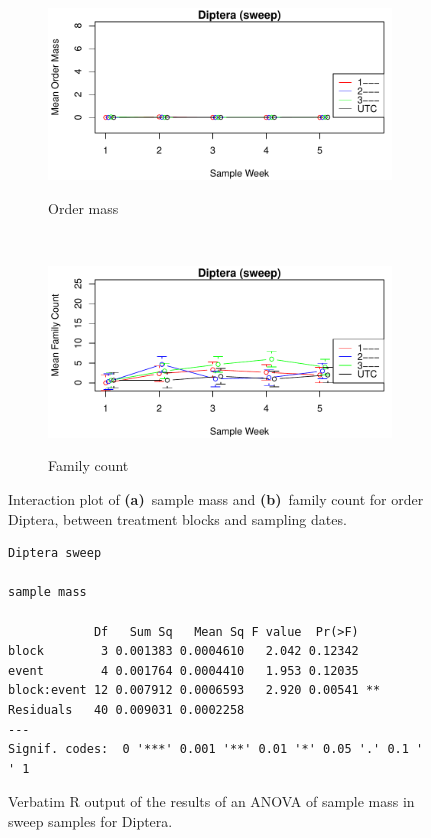 \documentclass[10pt,letterpaper,twocolumn]{article}
\begin{document}
\begin{figure}[h]
	\centering
	\begin{subfigure}[b]{0.45\textwidth}
		\caption{Order mass}
		\includegraphics[width=\textwidth]{plots/blocks/interaction/mass/mass_sweep_Diptera_interplot.pdf}
		\label{fig:sweep_diptera_mass_interplot}
	\end{subfigure}
	~
	\begin{subfigure}[b]{0.45\textwidth}
		\caption{Family count}
		\includegraphics[width=\textwidth]{plots/blocks/interaction/family/family_sweep_Diptera_interplot.pdf}
		\label{fig:sweep_diptera_family_interplot}
	\end{subfigure}
	\caption{Interaction plot of \textbf{(a)}~sample mass and \textbf{(b)}~family count for order Diptera, between treatment blocks and sampling dates.}
	\label{fig:sweep_diptera_interplot}
	\smallskip
	\nointerlineskip
	\hrulefill
\end{figure}

\begin{figure}[h]
	\lstset{numbers=left}
	\lstset{xleftmargin=5mm,framexleftmargin=5mm}
	\begin{lstlisting}
Diptera sweep 

sample mass 

            Df   Sum Sq   Mean Sq F value  Pr(>F)   
block        3 0.001383 0.0004610   2.042 0.12342   
event        4 0.001764 0.0004410   1.953 0.12035   
block:event 12 0.007912 0.0006593   2.920 0.00541 **
Residuals   40 0.009031 0.0002258                   
---
Signif. codes:  0 '***' 0.001 '**' 0.01 '*' 0.05 '.' 0.1 ' ' 1
	\end{lstlisting}
	\caption{Verbatim R output of the results of an ANOVA of sample mass in sweep samples for Diptera.}
	\label{fig:sweep_diptera_mass_anova}
	\smallskip
	\nointerlineskip
	\hrulefill
\end{figure}
\end{document}

